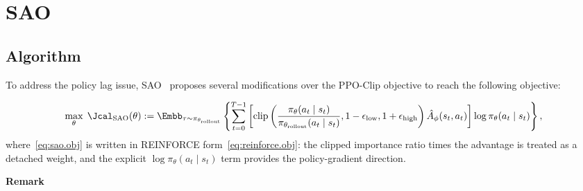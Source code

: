 \section{SAO}

\subsection{Algorithm}
To address the policy lag issue, SAO~\citep{hou2026single} proposes several modifications over the PPO-Clip objective to reach the following objective:

\begin{align}
     \label{eq:sao.obj}
     \max_{\theta}\;
     \Jcal_{\text{SAO}}(\theta)
     :=
     \Embb_{\tau \sim \pi_{\theta_{\text{rollout}}}}
     \left\{
         \sum_{t=0}^{T-1}
         \left[
             \operatorname{clip}\left(
                 \frac{\pi_{\theta}(a_t \mid s_t)}
                      {\pi_{\theta_{\text{rollout}}}(a_t \mid s_t)},
                 1-\epsilon_{\text{low}},
                 1+\epsilon_{\text{high}}
             \right)
             \hat{A}_{\phi}(s_t,a_t)
         \right]
         \log\pi_{\theta}(a_t \mid s_t)
     \right\},
\end{align}
where~\eqref{eq:sao.obj} is written in REINFORCE form~\eqref{eq:reinforce.obj}: the clipped importance ratio times the advantage is treated as a detached weight, and the explicit $\log\pi_{\theta}(a_t \mid s_t)$ term provides the policy-gradient direction.

\textbf{Remark}

